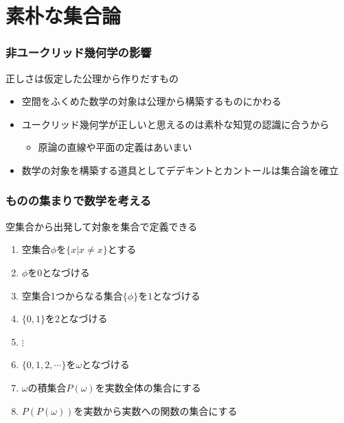\documentclass[unicode, 14pt, aspectratio=169]{beamer}
\begin{document}
\section{素朴な集合論}
\begin{frame}
  \frametitle{非ユークリッド幾何学の影響}
  {\large 正しさは仮定した公理から作りだすもの}
  \begin{itemize}
  \item 空間をふくめた数学の対象は公理から構築するものにかわる
  \item ユークリッド幾何学が正しいと思えるのは素朴な知覚の認識に合うから
    \begin{itemize}
    \item 原論の直線や平面の定義はあいまい
    \end{itemize}
  \item 数学の対象を構築する道具としてデデキントとカントールは集合論を確立
  \end{itemize}
\end{frame}
\begin{frame}
  \frametitle{ものの集まりで数学を考える}
  {\large 空集合から出発して対象を集合で定義できる}
  \begin{enumerate}
  \item 空集合$\phi$を$\{x|x\neq x\}$とする
  \item $\phi$を$0$となづける
  \item 空集合1つからなる集合$\{\phi\}$を$1$となづける
  \item $\{0, 1\}$を$2$となづける
  \item $\vdots$
  \item $\{0, 1, 2, \cdots\}$を$\omega$となづける
  \item $\omega$の積集合$P(\omega)$を実数全体の集合にする
  \item $P(P(\omega))$を実数から実数への関数の集合にする
  \end{enumerate}
\end{frame}
\end{document}
